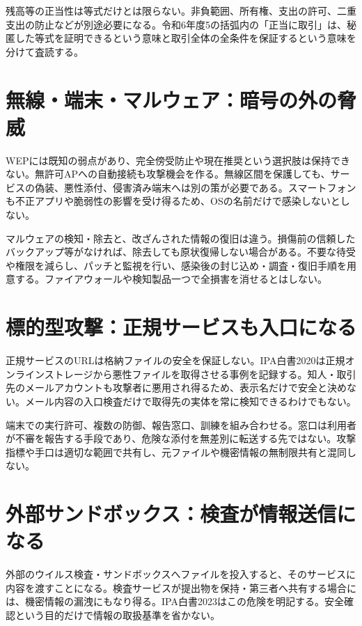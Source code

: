 残高等の正当性は等式だけとは限らない。非負範囲、所有権、支出の許可、二重支出の防止などが別途必要になる。令和6年度5の括弧内の「正当に取引」は、秘匿した等式を証明できるという意味と取引全体の全条件を保証するという意味を分けて査読する。

\section{無線・端末・マルウェア：暗号の外の脅威}
\label{theory:network:wireless}
WEPには既知の弱点があり、完全傍受防止や現在推奨という選択肢は保持できない。無許可APへの自動接続も攻撃機会を作る\cite{net_wep}。無線区間を保護しても、サービスの偽装、悪性添付、侵害済み端末へは別の策が必要である。スマートフォンも不正アプリや脆弱性の影響を受け得るため、OSの名前だけで感染しないとしない。

\label{theory:network:malware}
マルウェアの検知・除去と、改ざんされた情報の復旧は違う。損傷前の信頼したバックアップ等がなければ、除去しても原状復帰しない場合がある。不要な待受や権限を減らし、パッチと監視を行い、感染後の封じ込め・調査・復旧手順を用意する。ファイアウォールや検知製品一つで全損害を消せるとはしない。

\section{標的型攻撃：正規サービスも入口になる}
\label{theory:network:targeted}
正規サービスのURLは格納ファイルの安全を保証しない。IPA白書2020は正規オンラインストレージから悪性ファイルを取得させる事例を記録する。知人・取引先のメールアカウントも攻撃者に悪用され得るため、表示名だけで安全と決めない\cite{net_target2020}。メール内容の入口検査だけで取得先の実体を常に検知できるわけでもない。

端末での実行許可、複数の防御、報告窓口、訓練を組み合わせる。窓口は利用者が不審を報告する手段であり、危険な添付を無差別に転送する先ではない。攻撃指標や手口は適切な範囲で共有し、元ファイルや機密情報の無制限共有と混同しない。

\section{外部サンドボックス：検査が情報送信になる}
\label{theory:network:sandbox}
外部のウイルス検査・サンドボックスへファイルを投入すると、そのサービスに内容を渡すことになる。検査サービスが提出物を保持・第三者へ共有する場合には、機密情報の漏洩にもなり得る。IPA白書2023はこの危険を明記する\cite{net_target2023}。安全確認という目的だけで情報の取扱基準を省かない。

